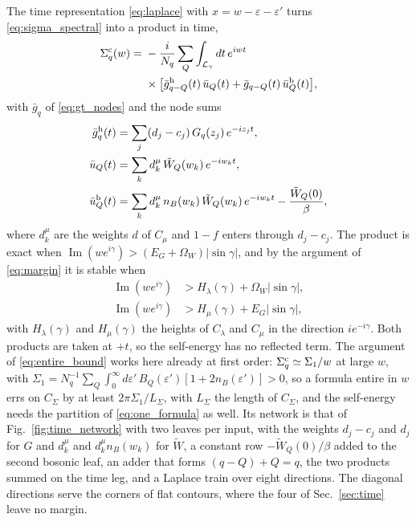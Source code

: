 \documentclass[aps,prb,reprint,a4paper]{revtex4-2}
\DeclareMathOperator{\Imag}{Im}
\begin{document}
The time representation \eqref{eq:laplace} with $x=w-\varepsilon-\varepsilon'$ turns \eqref{eq:sigma_spectral} into a product in time,
\begin{equation}
  \begin{aligned}
  \Sigma^{\rm c}_q(w)={}&-\frac i{N_q}\sum_Q\int_{\mathcal L_\gamma}dt\,e^{iwt}\\
  &\times\big[\bar g^{\rm h}_{q-Q}(t)\,\bar u_Q(t)+\bar g_{q-Q}(t)\,\bar u^{\rm b}_Q(t)\big],
  \end{aligned}
  \label{eq:sigma_time}
\end{equation}
with $\bar g_q$ of \eqref{eq:gt_nodes} and the node sums
\begin{equation}
  \begin{aligned}
  \bar g^{\rm h}_q(t)&=\sum_j(d_j-c_j)\,G_q(z_j)\,e^{-iz_jt},\\
  \bar u_Q(t)&=\sum_kd^\mu_k\,\tilde W_Q(w_k)\,e^{-iw_kt},\\
  \bar u^{\rm b}_Q(t)&=\sum_kd^\mu_k\,n_B(w_k)\,\tilde W_Q(w_k)\,e^{-iw_kt}-\frac{\tilde W_Q(0)}\beta,
  \end{aligned}
  \label{eq:sigma_nodes}
\end{equation}
where $d^\mu_k$ are the weights $d$ of $C_\mu$ and $1-f$ enters through $d_j-c_j$. The product is exact when $\Imag(we^{i\gamma})>(E_G+\Omega_W)\lvert\sin\gamma\rvert$, and by the argument of \eqref{eq:margin} it is stable when
\begin{equation}
  \begin{aligned}
  \Imag(we^{i\gamma})&>H_\lambda(\gamma)+\Omega_W\lvert\sin\gamma\rvert,\\
  \Imag(we^{i\gamma})&>H_\mu(\gamma)+E_G\lvert\sin\gamma\rvert,
  \end{aligned}
  \label{eq:sigma_margin}
\end{equation}
with $H_\lambda(\gamma)$ and $H_\mu(\gamma)$ the heights of $C_\lambda$ and $C_\mu$ in the direction $ie^{-i\gamma}$. Both products are taken at $+t$, so the self-energy has no reflected term. The argument of \eqref{eq:entire_bound} works here already at first order: $\Sigma^{\rm c}_q\simeq\Sigma_1/w$ at large $w$, with $\Sigma_1=N_q^{-1}\sum_Q\int_0^\infty d\varepsilon'\,B_Q(\varepsilon')[1+2n_B(\varepsilon')]>0$, so a formula entire in $w$ errs on $C_\Sigma$ by at least $2\pi\Sigma_1/L_\Sigma$, with $L_\Sigma$ the length of $C_\Sigma$, and the self-energy needs the partition of \eqref{eq:one_formula} as well. Its network is that of Fig.~\ref{fig:time_network} with two leaves per input, with the weights $d_j-c_j$ and $d_j$ for $G$ and $d^\mu_k$ and $d^\mu_kn_B(w_k)$ for $\tilde W$, a constant row $-\tilde W_Q(0)/\beta$ added to the second bosonic leaf, an adder that forms $(q-Q)+Q=q$, the two products summed on the time leg, and a Laplace train over eight directions. The diagonal directions serve the corners of flat contours, where the four of Sec.~\ref{sec:time} leave no margin.
\end{document}

